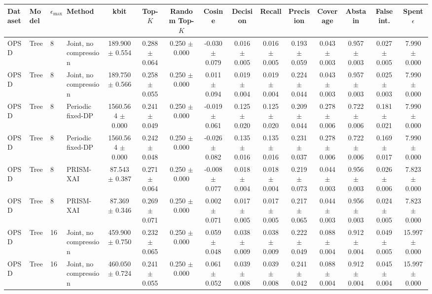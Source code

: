 \begin{tabular}{llllccccccccccc}
\toprule
Dataset & Model & $\epsilon_{\max}$ & Method & kbit & Top-$K$ & Random Top-$K$ & Cosine & Decision & Recall & Precision & Coverage & Abstain & False int. & Spent $\epsilon$ \\
\midrule
OPSD & Tree & 8 & Joint, no compression & 189.900 $\pm$ 0.554 & 0.288 $\pm$ 0.064 & 0.250 $\pm$ 0.000 & -0.030 $\pm$ 0.079 & 0.016 $\pm$ 0.005 & 0.016 $\pm$ 0.005 & 0.193 $\pm$ 0.059 & 0.043 $\pm$ 0.003 & 0.957 $\pm$ 0.003 & 0.027 $\pm$ 0.005 & 7.990 $\pm$ 0.000 \\
OPSD & Tree & 8 & Joint, no compression & 189.750 $\pm$ 0.566 & 0.258 $\pm$ 0.055 & 0.250 $\pm$ 0.000 & 0.011 $\pm$ 0.094 & 0.019 $\pm$ 0.004 & 0.019 $\pm$ 0.004 & 0.224 $\pm$ 0.044 & 0.043 $\pm$ 0.003 & 0.957 $\pm$ 0.003 & 0.025 $\pm$ 0.003 & 7.990 $\pm$ 0.000 \\
OPSD & Tree & 8 & Periodic fixed-DP & 1560.564 $\pm$ 0.000 & 0.241 $\pm$ 0.049 & 0.250 $\pm$ 0.000 & -0.019 $\pm$ 0.061 & 0.125 $\pm$ 0.020 & 0.125 $\pm$ 0.020 & 0.209 $\pm$ 0.044 & 0.278 $\pm$ 0.006 & 0.722 $\pm$ 0.006 & 0.181 $\pm$ 0.021 & 7.990 $\pm$ 0.000 \\
OPSD & Tree & 8 & Periodic fixed-DP & 1560.564 $\pm$ 0.000 & 0.242 $\pm$ 0.048 & 0.250 $\pm$ 0.000 & -0.026 $\pm$ 0.082 & 0.135 $\pm$ 0.016 & 0.135 $\pm$ 0.016 & 0.231 $\pm$ 0.037 & 0.278 $\pm$ 0.006 & 0.722 $\pm$ 0.006 & 0.169 $\pm$ 0.017 & 7.990 $\pm$ 0.000 \\
OPSD & Tree & 8 & PRISM-XAI & 87.543 $\pm$ 0.387 & 0.271 $\pm$ 0.064 & 0.250 $\pm$ 0.000 & -0.008 $\pm$ 0.077 & 0.018 $\pm$ 0.004 & 0.018 $\pm$ 0.004 & 0.219 $\pm$ 0.073 & 0.044 $\pm$ 0.003 & 0.956 $\pm$ 0.003 & 0.026 $\pm$ 0.006 & 7.823 $\pm$ 0.000 \\
OPSD & Tree & 8 & PRISM-XAI & 87.369 $\pm$ 0.346 & 0.269 $\pm$ 0.071 & 0.250 $\pm$ 0.000 & 0.002 $\pm$ 0.071 & 0.017 $\pm$ 0.005 & 0.017 $\pm$ 0.005 & 0.217 $\pm$ 0.065 & 0.044 $\pm$ 0.003 & 0.956 $\pm$ 0.003 & 0.024 $\pm$ 0.005 & 7.823 $\pm$ 0.000 \\
OPSD & Tree & 16 & Joint, no compression & 459.900 $\pm$ 0.750 & 0.232 $\pm$ 0.065 & 0.250 $\pm$ 0.000 & 0.059 $\pm$ 0.048 & 0.038 $\pm$ 0.009 & 0.038 $\pm$ 0.009 & 0.222 $\pm$ 0.049 & 0.088 $\pm$ 0.004 & 0.912 $\pm$ 0.004 & 0.049 $\pm$ 0.005 & 15.997 $\pm$ 0.000 \\
OPSD & Tree & 16 & Joint, no compression & 460.050 $\pm$ 0.724 & 0.241 $\pm$ 0.055 & 0.250 $\pm$ 0.000 & 0.061 $\pm$ 0.052 & 0.039 $\pm$ 0.008 & 0.039 $\pm$ 0.008 & 0.241 $\pm$ 0.042 & 0.088 $\pm$ 0.004 & 0.912 $\pm$ 0.004 & 0.045 $\pm$ 0.004 & 15.997 $\pm$ 0.000 \\

\end{tabular}
